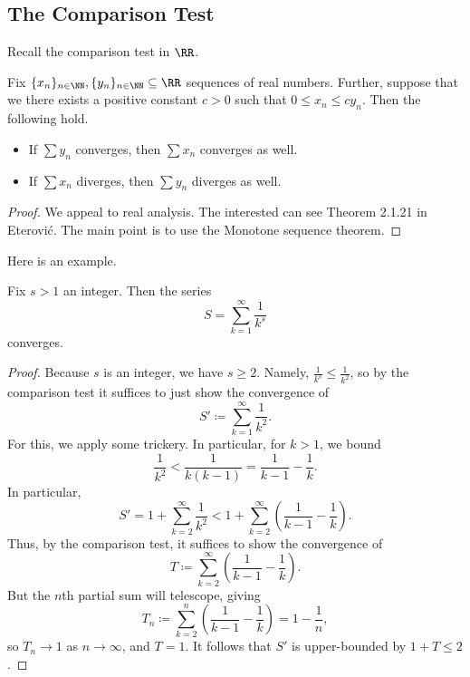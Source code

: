 \documentclass[../notes.tex]{subfiles}
\begin{document}
\subsection{The Comparison Test}
Recall the comparison test in $\RR$.
\begin{theorem}
	Fix $\{x_n\}_{n\in\NN},\{y_n\}_{n\in\NN}\subseteq\RR$ sequences of real numbers. Further, suppose that we there exists a positive constant $c>0$ such that $0\le x_n\le cy_n$. Then the following hold.
	\begin{itemize}
		\item If $\sum y_n$ converges, then $\sum x_n$ converges as well.
		\item If $\sum x_n$ diverges, then $\sum y_n$ diverges as well.
	\end{itemize}
\end{theorem}
\begin{proof}
	We appeal to real analysis. The interested can see Theorem 2.1.21 in Eterovi\'c. The main point is to use the Monotone sequence theorem.
\end{proof}
Here is an example.
\begin{exe}
	Fix $s>1$ an integer. Then the series
	\[S=\sum_{k=1}^\infty\frac1{k^s}\]
	converges.
\end{exe}
\begin{proof}
	Because $s$ is an integer, we have $s\ge2$. Namely, $\frac1{k^s}\le\frac1{k^2}$, so by the comparison test it suffices to just show the convergence of
	\[S'\coloneqq\sum_{k=1}^\infty\frac1{k^2}.\]
	For this, we apply some trickery. In particular, for $k>1$, we bound
	\[\frac1{k^2}<\frac1{k(k-1)}=\frac1{k-1}-\frac1k.\]
	In particular,
	\[S'=1+\sum_{k=2}^\infty\frac1{k^2}<1+\sum_{k=2}^\infty\left(\frac1{k-1}-\frac1k\right).\]
	Thus, by the comparison test, it suffices to show the convergence of
	\[T\coloneqq\sum_{k=2}^\infty\left(\frac1{k-1}-\frac1k\right).\]
	But the $n$th partial sum will telescope, giving
	\[T_n\coloneqq\sum_{k=2}^n\left(\frac1{k-1}-\frac1k\right)=1-\frac1n,\]
	so $T_n\to1$ as $n\to\infty$, and $T=1$. It follows that $S'$ is upper-bounded by $1+T\le2$.
\end{proof}
\end{document}
